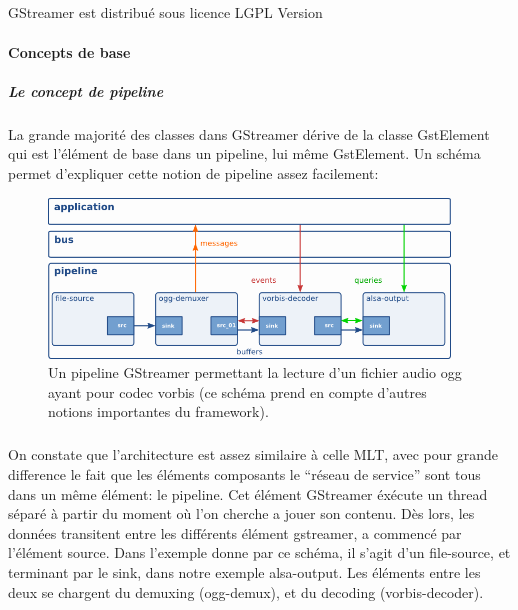 \subparagraph{}

GStreamer est distribué sous licence LGPL Version

\paragraph{Concepts de base}

\subparagraph{Le concept de pipeline}

\subparagraph{}

La grande majorité des classes dans GStreamer dérive de la classe
GstElement qui est l'élément de base dans un pipeline, lui même
GstElement. Un schéma permet d'expliquer cette notion de pipeline assez
facilement:

\begin{figure} [H]

  \begin{center}

    \includegraphics[width=0.95\textwidth]{images/gstpipeline}

  \end{center}

  \caption{Un pipeline GStreamer permettant la lecture d'un fichier
  audio ogg
    ayant pour codec vorbis (ce schéma prend en compte d'autres notions
    importantes du framework).}

  \label{Yes}

\end{figure}

\subparagraph{}

On constate que l'architecture est assez similaire à celle MLT, avec
pour grande difference le fait que les éléments composants le ``réseau
de service'' sont tous dans un même élément: le pipeline. Cet élément
GStreamer éxécute un thread séparé à partir du moment où l'on cherche a
jouer son contenu. Dès lors, les données transitent entre les différents
élément gstreamer, a commencé par l'élément source. Dans l'exemple
donne par ce schéma, il s'agit d'un file-source, et terminant par le
sink, dans notre exemple alsa-output. Les éléments entre les deux se
chargent du demuxing (ogg-demux), et du decoding (vorbis-decoder).

